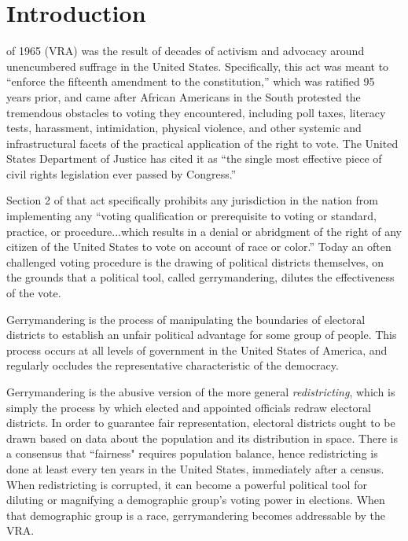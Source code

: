 \chapter{Introduction}
\label{introduction}

 of 1965 (VRA)\cite{vra} was the result of decades of activism and advocacy around unencumbered suffrage in the United States. Specifically, this act was meant to “enforce the fifteenth amendment to the constitution,” which was ratified 95 years prior, and came after African Americans in the South protested the tremendous obstacles to voting they encountered, including poll taxes, literacy tests, harassment, intimidation, physical violence, and other systemic and infrastructural facets of the practical application of the right to vote. The United States Department of Justice has cited it as “the single most effective piece of civil rights legislation ever passed by Congress.”\cite{effective}

Section 2 of that act specifically prohibits any jurisdiction in the nation from implementing any “voting qualification or prerequisite to voting or standard, practice, or procedure...which results in a denial or abridgment of the right of any citizen of the United States to vote on account of race or color.” Today an often challenged voting procedure is the drawing of political districts themselves, on the grounds that a political tool, called gerrymandering, dilutes the effectiveness of the vote.

Gerrymandering is the process of manipulating the boundaries of electoral districts to establish an unfair political advantage for some group of people. This process occurs at all levels of government in the United States of America, and regularly occludes the representative characteristic of the democracy.

Gerrymandering is the abusive version of the more general \textit{redistricting}, which is simply the process by which elected and appointed officials redraw electoral districts. In order to guarantee fair representation, electoral districts ought to be drawn based on data about the population and its distribution in space. There is a consensus that ``fairness" requires population balance, hence redistricting is done at least every ten years in the United States, immediately after a census. When redistricting is corrupted, it can become a powerful political tool for diluting or magnifying a demographic group's voting power in elections. When that demographic group is a race, gerrymandering becomes addressable by the VRA.

